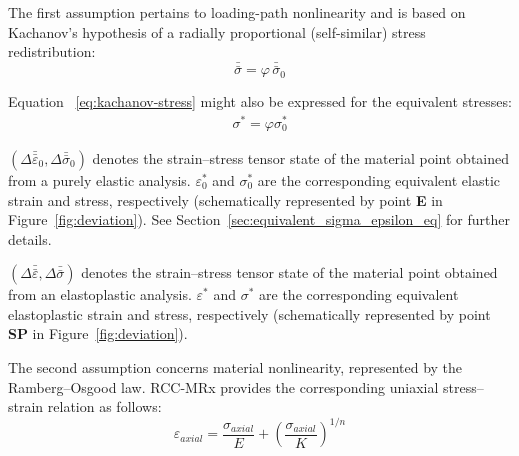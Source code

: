 \documentclass[10pt,a4paper]{article}
\begin{document}
The first assumption pertains to loading-path nonlinearity and is based on Kachanov's hypothesis of a radially proportional (self-similar) stress redistribution:
\begin{equation}
\bar{\bar\sigma} = \varphi\,\bar{\bar\sigma}_0 
\label{eq:kachanov-stress}
\end{equation}


Equation ~\eqref{eq:kachanov-stress} might also be expressed for the equivalent stresses:
\begin{align} 
\sigma^* =\varphi \sigma_0^* 
\label{eq:kachanov-stress-equivalent}
\end{align}





$(\Delta\bar{\bar{\varepsilon}}_0, \Delta\bar{\bar{\sigma}}_0)$ denotes the strain--stress tensor state of the material point obtained from a purely elastic analysis. $\varepsilon_0^*$ and $\sigma_0^*$ are the corresponding equivalent elastic strain and stress, respectively (schematically represented by point \textbf{E} in Figure~\ref{fig:deviation}). See Section~\ref{sec:equivalent_sigma_epsilon_eq} for further details.

$(\Delta\bar{\bar{\varepsilon}}, \Delta\bar{\bar{\sigma}})$ denotes the strain--stress tensor state of the material point obtained from an elastoplastic analysis. $\varepsilon^*$ and $\sigma^*$ are the corresponding equivalent elastoplastic strain and stress, respectively (schematically represented by point \textbf{SP} in Figure~\ref{fig:deviation}).






The second assumption concerns material nonlinearity, represented by the Ramberg--Osgood law. RCC-MRx provides the corresponding uniaxial stress--strain relation as follows:
\begin{equation}
\varepsilon_{axial} = \frac{\sigma_{axial}}{E} + \left(\frac{\sigma_{axial}}{K}\right)^{1/n}
\label{eq:Osgood_code}
\end{equation}






\end{document}
